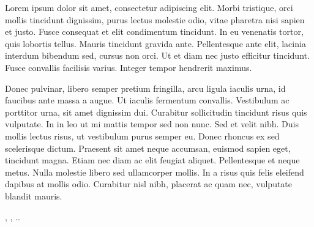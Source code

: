 
\label{Cap:TrabalhosRelacionados}



Lorem ipsum dolor sit amet, consectetur adipiscing elit. Morbi tristique, orci mollis tincidunt dignissim, purus lectus molestie odio, vitae pharetra nisi sapien et justo. Fusce consequat et elit condimentum tincidunt. In eu venenatis tortor, quis lobortis tellus. Mauris tincidunt gravida ante. Pellentesque ante elit, lacinia interdum bibendum sed, cursus non orci. Ut et diam nec justo efficitur tincidunt. Fusce convallis facilisis varius. Integer tempor hendrerit maximus.

Donec pulvinar, libero semper pretium fringilla, arcu ligula iaculis urna, id faucibus ante massa a augue. Ut iaculis fermentum convallis. Vestibulum ac porttitor urna, sit amet dignissim dui. Curabitur sollicitudin tincidunt risus quis vulputate. In in leo ut mi mattis tempor sed non nunc. Sed et velit nibh. Duis mollis lectus risus, ut vestibulum purus semper eu. Donec rhoncus ex sed scelerisque dictum. Praesent sit amet neque accumsan, euismod sapien eget, tincidunt magna. Etiam nec diam ac elit feugiat aliquet. Pellentesque et neque metus. Nulla molestie libero sed ullamcorper mollis. In a risus quis felis eleifend dapibus at mollis odio. Curabitur nisl nibh, placerat ac quam nec, vulputate blandit mauris.

\cite{art-solimaes03}, \cite{col-pinto00}, ..